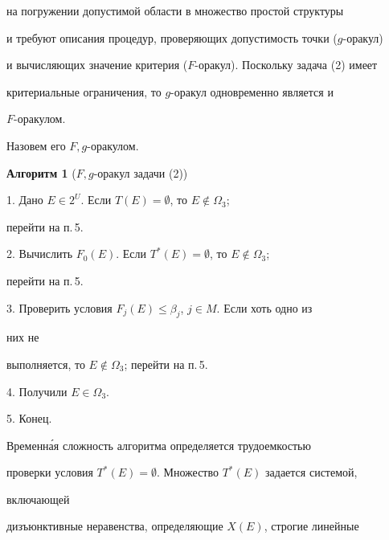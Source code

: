 на погружении допустимой области в множество простой структуры 


и требуют описания процедур, проверяющих допустимость точки ($g$-оракул) 


и вычисляющих значение критерия ($F$-оракул). Поскольку задача (2) имеет 


критериальные ограничения, то $g$-оракул одновременно является и 


$F$-оракулом. 


Назовем его $F,g$-оракулом. 




 


\begin{center} 


{\bf Алгоритм 1} ($F,g$-оракул задачи (2)) 


\end{center} 


 


1. Дано $E\in2^U$. Если $T(E)=\emptyset$, то $E\notin\Omega_3$; 


перейти на п.\,5. 


 


2. Вычислить $F_0(E)$. Если $T^*(E)=\emptyset$, то $E\notin\Omega_3$; 


перейти на п.\,5. 


 


3. Проверить условия $F_j(E)\le\beta_j$, $j\in M$. Если хоть одно из 


них не 


выполняется, то $E\notin\Omega_3$; перейти на п.\,5. 


 


4. Получили $E\in\Omega_3$. 


 


5. Конец. 




 


Временн\'ая сложность алгоритма определяется трудоемкостью 


проверки условия $T^*(E)=\emptyset$. Множество $T^*(E)$ задается системой, 


включающей 


дизъюнктивные неравенства, определяющие $X(E)$, строгие линейные 


